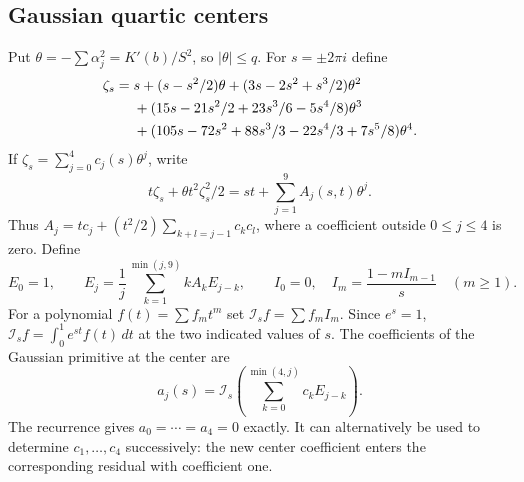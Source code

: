 \subsection{Gaussian quartic centers}

Put $\theta=-\sum\alpha_j^2=K'(b)/S^2$, so $|\theta|\le q$.
For $s=\pm2\pi i$ define
\begin{align}
 \zeta_s={}&s+(s-s^2/2)\theta+(3s-2s^2+s^3/2)\theta^2\notag\\
 &+(15s-21s^2/2+23s^3/6-5s^4/8)\theta^3\notag\\
 &+(105s-72s^2+88s^3/3-22s^4/3+7s^5/8)\theta^4.
 \label{lt:gaussian-center}
\end{align}
If $\zeta_s=\sum_{j=0}^4c_j(s)\theta^j$, write
\[
 t\zeta_s+\theta t^2\zeta_s^2/2
       =st+\sum_{j=1}^9 A_j(s,t)\theta^j.
\]
Thus $A_j=tc_j+(t^2/2)\sum_{k+l=j-1}c_kc_l$, where a coefficient
outside $0\le j\le4$ is zero. Define
\[
 E_0=1,\qquad E_j=\frac1j\sum_{k=1}^{\min(j,9)}kA_kE_{j-k},
 \qquad I_0=0,\quad I_m=\frac{1-mI_{m-1}}s\quad(m\ge1).
\]
For a polynomial $f(t)=\sum f_mt^m$ set
$\mathcal I_s f=\sum f_m I_m$. Since $e^s=1$,
$\mathcal I_s f=\int_0^1e^{st}f(t)\,dt$ at the two indicated values
of $s$. The coefficients of the Gaussian primitive at the center are
\[
 a_j(s)=\mathcal I_s\left(\sum_{k=0}^{\min(4,j)}c_kE_{j-k}\right).
\]
The recurrence gives $a_0=\cdots=a_4=0$ exactly. It can alternatively
be used to determine $c_1,\ldots,c_4$ successively: the new center
coefficient enters the corresponding residual with coefficient one.

